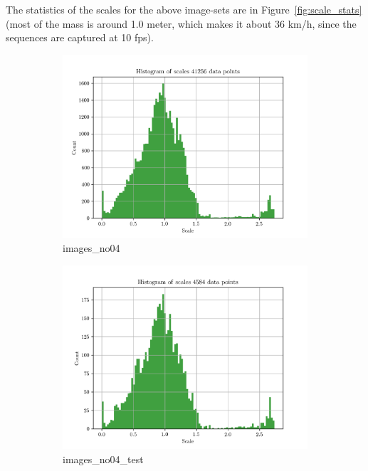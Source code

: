 \documentclass{article}
\begin{document}
The statistics of the scales for the above image-sets are in Figure~\ref{fig:scale_stats} (most of the mass is around 1.0 meter, which makes it about 36 km/h, since the sequences are captured at 10 fps).

\begin{figure}[h!]
	\begin{subfigure}{0.5\textwidth}
		\includegraphics[width=0.9\linewidth]{stats_images_no04_rgb_shuf}
		\caption{images\_no04}		
		\label{fig:stats_images_no04_rgb_shuf}
	\end{subfigure}
	\begin{subfigure}{0.5\textwidth}
		\includegraphics[width=0.9\linewidth]{stats_images_no04_rgb_test_shuf}
		\caption{images\_no04\_test}		
		\label{fig:stats_images_no04_rgb_test_shuf}
	\end{subfigure}
	\begin{subfigure}{0.5\textwidth}

\end{subfigure}
\end{figure}
\end{document}
